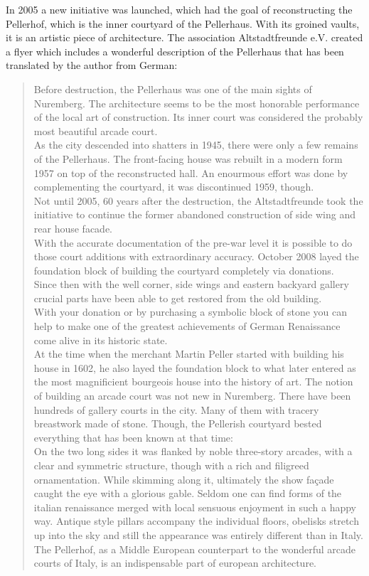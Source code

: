 In 2005 a new initiative was launched, which had the goal of reconstructing the Pellerhof, which is the inner courtyard of the Pellerhaus. With its groined vaults, it is an artistic piece of architecture. The association Altstadtfreunde e.V. created a flyer \parencite{afWiederaufbauDesPellerhofes} which includes a wonderful description of the Pellerhaus that has been translated by the author from German:

\blockquote{
	Before destruction, the Pellerhaus was one of the main sights of Nuremberg. The architecture seems to be the most honorable performance of the local art of construction. Its inner court was considered the probably most beautiful arcade court.\\
	As the city descended into shatters in 1945, there were only a few remains of the Pellerhaus. The front-facing house was rebuilt in a modern form 1957 on top of the reconstructed hall. An enourmous effort was done by complementing the courtyard, it was discontinued 1959, though.\\
	Not until 2005, 60 years after the destruction, the Altstadtfreunde took the initiative to continue the former abandoned construction of side wing and rear house facade.\\
	With the accurate documentation of the pre-war level it is possible to do those court additions with extraordinary accuracy. October 2008 layed the foundation block of building the courtyard completely via donations.\\
	Since then with the well corner, side wings and eastern backyard gallery crucial parts have been able to get restored from the old building.\\
	With your donation or by purchasing a symbolic block of stone you can help to make one of the greatest achievements of German Renaissance come alive in its historic state.\\
	At the time when the merchant Martin Peller started with building his house in 1602, he also layed the foundation block to what later entered as the most magnificient bourgeois house into the history of art. The notion of building an arcade court was not new in Nuremberg. There have been hundreds of gallery courts in the city. Many of them with tracery breastwork made of stone. Though, the Pellerish courtyard bested everything that has been known at that time:\\
	On the two long sides it was flanked by noble three-story arcades, with a clear and symmetric structure, though with a rich and filigreed ornamentation. While skimming along it, ultimately the show façade caught the eye with a glorious gable. Seldom one can find forms of the italian renaissance merged with local sensuous enjoyment in such a happy way. Antique style pillars accompany the individual floors, obelisks stretch up into the sky and still the appearance was entirely different than in Italy. The Pellerhof, as a Middle European counterpart to the wonderful arcade courts of Italy, is an indispensable part of european architecture.\\
}

